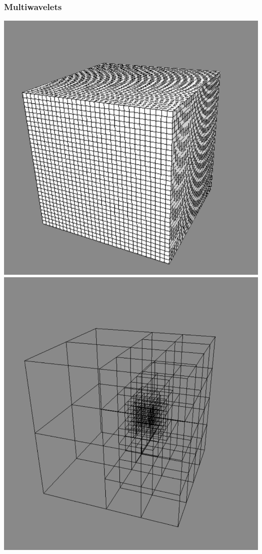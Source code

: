 \begin{frame}
\frametitle{Multiwavelets}
\centering
\includegraphics[scale=0.3]{figures/unifgrid.pdf}
\includegraphics[scale=0.1788]{figures/adapgrid.pdf}
\end{frame}

